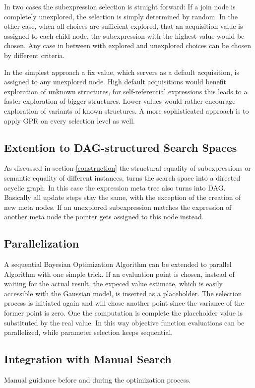 \documentclass[english]{article}
\begin{document}
In two cases the subexpression selection is straight forward: If a join node is completely unexplored, the selection is simply determined by random. In the other case, when all choices are sufficient explored, that an acquisition value is assigned to each child node, the subexpression with the highest value would be chosen. Any case in between with explored and unexplored choices can be chosen by different criteria.

In the simplest approach a fix value, which servers as a default acquisition, is assigned to any unexplored node. High default acquisitions would benefit exploration of unknown structures, for self-referential expressions this leads to a faster exploration of bigger structures. Lower values would rather encourage exploration of variants of known structures.
A more sophisticated approach is to apply GPR on every selection level as well.

\subsection{Extention to DAG-structured Search Spaces}
As discussed in section \ref{construction} the structural equality of subexpressions or semantic equality of different instances, turns the search space into a directed acyclic graph. In this case the expression meta tree also turns into DAG. Basically all update steps stay the same, with the exception of the creation of new meta nodes. If an unexplored subexpression matches the expression of another meta node the pointer gets assigned to this node instead.

\subsection{Parallelization}
A sequential Bayesian Optimization Algorithm can be extended to parallel Algorithm with one simple trick. If an evaluation point is chosen, instead of waiting for the actual result, the expeced value estimate, which is easily accessible with the Gaussian model, is inserted as a placeholder. The selection process is initiated again and will chose another point since the variance of the former point is zero. One the computation is complete the placeholder value is substituted by the real value. In this way objective function evaluations can be parallelized, while parameter selection keeps sequential.

\subsection{Integration with Manual Search}
Manual guidance before and during the optimization process.
\end{document}
